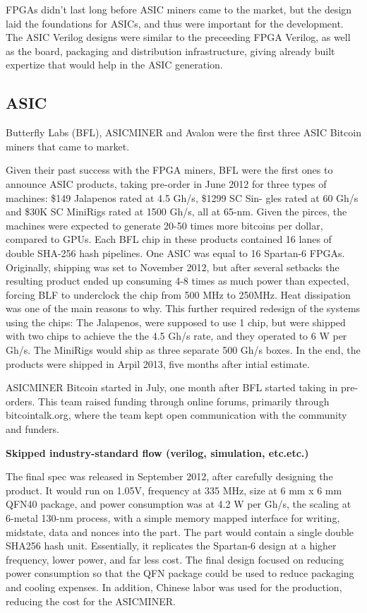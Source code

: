FPGAs didn't last long before ASIC miners came to the market, but the design laid the foundations for ASICs, and thus were important for the development. 
The ASIC Verilog designs were similar to the preceeding FPGA Verilog, as well as the board, packaging and distribution infrastructure, giving already built expertize that would help in the ASIC generation.
\cite{bespoke-silicon}

\subsection{ASIC}

Butterfly Labs (BFL), ASICMINER and Avalon were the first three ASIC Bitcoin miners that came to market.

Given their past success with the FPGA miners, BFL were the first ones to announce ASIC products, taking pre-order in June 2012 for three types of machines:
\$149 Jalapenos rated at 4.5 Gh/s, \$1299 SC Sin- gles rated at 60 Gh/s and \$30K SC MiniRigs rated at 1500 Gh/s, all at 65-nm.
Given the pirces, the machines were expected to generate 20-50 times more bitcoins per dollar, compared to GPUs.
Each BFL chip in these products contained 16 lanes of double SHA-256 hash pipelines.
One ASIC was equal to 16 Spartan-6 FPGAs. 
Originally, shipping was set to November 2012, but after several setbacks the resulting product ended up consuming 4-8 times as much power than expected, forcing BLF to underclock the chip from 500 MHz to 250MHz.
Heat dissipation was one of the main reasons to why.
This further required redesign of the systems using the chips:
The Jalapenos, were supposed to use 1 chip, but were shipped with two chips to achieve the the 4.5 Gh/s rate, and they operated to 6 W per Gh/s. 
The MiniRigs would ship as three separate 500 Gh/s boxes.
In the end, the products were shipped in Arpil 2013, five months after intial estimate.

ASICMINER Bitcoin started in July, one month after BFL started taking in pre-orders.
This team raised funding through online forums, primarily through bitcointalk.org, where the team kept open communication with the community and funders.

\textbf{Skipped industry-standard flow (verilog, simulation, etc.etc.)}

The final spec was released in September 2012, after carefully designing the product.
It would run on 1.05V, frequency at 335 MHz, size at 6 mm x 6 mm QFN40 package, and power consumption was at 4.2 W per Gh/s, the scaling at 6-metal 130-nm process, with a simple memory mapped interface for writing, midstate, data and nonces into the part. 
The part would contain a single double SHA256 hash unit.
Essentially, it replicates the Spartan-6 design at a higher frequency, lower power, and far less cost.
The final design focused on reducing power consumption so that the QFN package could be used to reduce packaging and cooling expenses.
In addition, Chinese labor was used for the production, reducing the cost for the ASICMINER.

